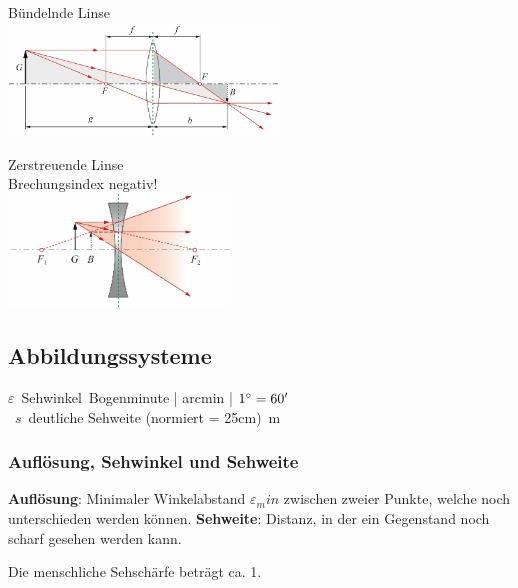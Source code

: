 \begin{center}
	\begin{minipage}{0.3\textwidth}
		Bündelnde Linse \\
		\includegraphics[height=3cm,keepaspectratio=true]{Images/buendelndelinse.png}
	\end{minipage}%
	\begin{minipage}{0.3\textwidth}
		Zerstreuende Linse \\
		Brechungsindex negativ! \\
		\includegraphics[height=3cm,keepaspectratio=true]{Images/streuendelinse.png}
	\end{minipage}
\end{center}

\subsection{Abbildungssysteme}

\unit{$ \varepsilon $}{Sehwinkel}{Bogenminute | arcmin | $ 1^\circ = 60\SIUnitSymbolArcminute $} \\
\unit{$ s $}{deutliche Sehweite (normiert = 25cm)}{m}



\subsubsection{Auflösung, Sehwinkel und Sehweite}

\textbf{Auflösung}: Minimaler Winkelabstand $\varepsilon_min$ zwischen zweier Punkte, welche noch
unterschieden werden können.
\textbf{Sehweite}: Distanz, in der ein Gegenstand noch scharf gesehen werden kann.

Die menschliche Sehschärfe beträgt ca. 1\SIUnitSymbolArcminute.


